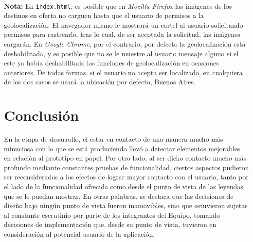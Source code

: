 \documentclass[spanish]{article}
\begin{document}
	\paragraph{} \textbf{Nota: } En \verb|index.html|, es posible que en \textit{Mozilla Firefox} las imágenes de los destinos en oferta no carguen hasta que el usuario de permisos a la geolocalización. El navegador mismo le mostrará un cartel al usuario solicitando permisos para rastrearlo, tras lo cual, de ser aceptada la solicitud, las imágenes cargarán. En \textit{Google Chrome}, por el contrario, por defecto la geolocalización está deshabilitada, y es posible que no se le muestre al usuario mensaje alguno si el este ya había deshabilitado las funciones de geolocalización en ocasiones anteriores. De todas formas, si el usuario no acepta ser localizado, en cualquiera de los dos casos se usará la ubicación por defecto, Buenos Aires. 
	\newpage
	\section{Conclusión}
	\paragraph{} En la etapa de desarrollo, el estar en contacto de una manera mucho más minuciosa con lo que se está produciendo llevó a detectar elementos mejorables en relación al prototipo en papel. Por otro lado, al ser dicho contacto mucho más profundo mediante constantes pruebas de funcionalidad, ciertos aspectos pudieron ser reconsiderados a los efectos de lograr mayor contacto con el usuario, tanto por el lado de la funcionalidad ofrecida como desde el punto de vista de las leyendas que se le puedan mostrar. En otras palabras, se destaca que las decisiones de diseño  bajo ningún punto de vista fueron inamovibles, sino que estuvieron sujetas al constante escrutinio por parte de los integrantes del Equipo, tomando decisiones de implementación que, desde su punto de vista, tuvieron en consideración al potencial usuario de la aplicación.   
\end{document}
